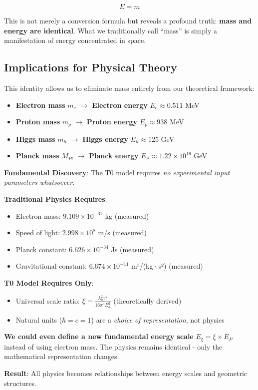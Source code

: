 \documentclass[12pt,a4paper]{article}
\newcommand{\EP}{E_{\text{P}}}
\begin{document}
	\begin{equation}
		\boxed{E = m}
		\label{eq:energy_mass_identity}
	\end{equation}
	
	This is not merely a conversion formula but reveals a profound truth: \textbf{mass and energy are identical}. What we traditionally call ``mass'' is simply a manifestation of energy concentrated in space.
	
	\subsection{Implications for Physical Theory}
	\label{subsec:implications}
	
	This identity allows us to eliminate mass entirely from our theoretical framework:
	
	\begin{itemize}
		\item \textbf{Electron mass} $m_e$ $\rightarrow$ \textbf{Electron energy} $E_e \approx 0.511$ MeV
		\item \textbf{Proton mass} $m_p$ $\rightarrow$ \textbf{Proton energy} $E_p \approx 938$ MeV  
		\item \textbf{Higgs mass} $m_h$ $\rightarrow$ \textbf{Higgs energy} $E_h \approx 125$ GeV
		\item \textbf{Planck mass} $M_{Pl}$ $\rightarrow$ \textbf{Planck energy} $\EP \approx 1.22 \times 10^{19}$ GeV
	\end{itemize}
	
\begin{tcolorbox}[colback=red!5!white,colframe=red!75!black,title=Revolutionary Insight: True Parameter-Free Physics]
	\textbf{Fundamental Discovery}: The T0 model requires \textit{no experimental input parameters whatsoever}.
	
	\textbf{Traditional Physics Requires}:
	\begin{itemize}
		\item Electron mass: $9.109 \times 10^{-31}$ kg (measured)
		\item Speed of light: $2.998 \times 10^8$ m/s (measured)  
		\item Planck constant: $6.626 \times 10^{-34}$ Js (measured)
		\item Gravitational constant: $6.674 \times 10^{-11}$ m³/(kg·s²) (measured)
	\end{itemize}
	
	\textbf{T0 Model Requires Only}:
	\begin{itemize}
		\item Universal scale ratio: $\xi = \frac{\lambda_h^2 v^2}{16\pi^3 E_h^2}$ (theoretically derived)
		\item Natural units ($\hbar = c = 1$) are a \textit{choice of representation}, not physics
	\end{itemize}
	
	\textbf{We could even define a new fundamental energy scale} $E_\xi = \xi \times E_P$ instead of using electron mass. The physics remains identical - only the mathematical representation changes.
\end{tcolorbox}	\textbf{Result}: All physics becomes relationships between energy scales and geometric structures.
	
\end{document}
